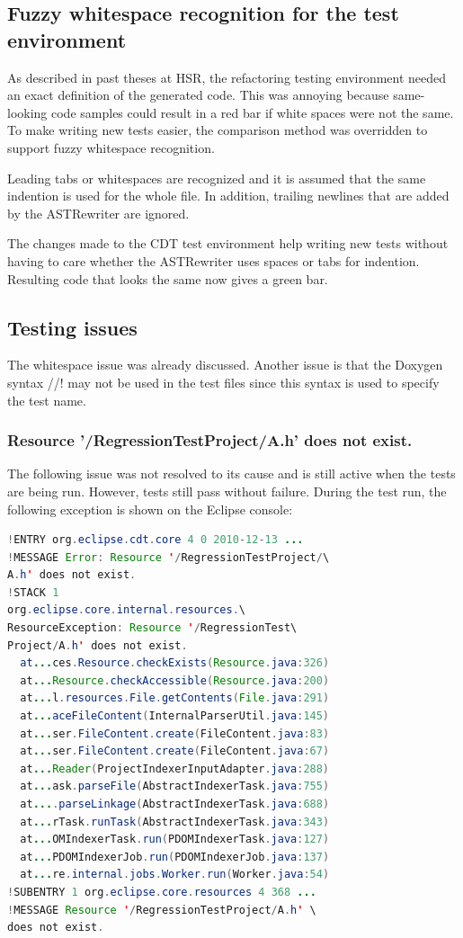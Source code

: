 \subsection[Fuzzy whitespace recognition for the tests]{Fuzzy whitespace 
recognition for the test environment}

As described in past theses at HSR, the refactoring testing environment
needed an exact definition of the generated code. This was annoying because
same-looking code samples could result in a red bar if white spaces were not the
same. To make writing new tests easier, the comparison method was overridden to
support fuzzy whitespace recognition.

Leading tabs or whitespaces are recognized and it is assumed that the same
indention is used for the whole file. In addition, trailing newlines that are
added by the ASTRewriter are ignored.

The changes made to the CDT test environment help writing new tests without
having to care whether the ASTRewriter uses spaces or tabs for indention.
Resulting code that looks the same now gives a green bar.

\subsection{Testing issues}

The whitespace issue was already discussed. Another issue is that the Doxygen 
syntax //! may not be used in the test files since this syntax is used to 
specify the test name.

\subsubsection{Resource '/RegressionTestProject/A.h' does not exist.}

The following issue was not resolved to its cause and is still active when the 
tests are being run. However, tests still pass without failure. During the test 
run, the following exception is shown on the Eclipse console:

\begin{lstlisting}[caption={Randomly appearing error message},language=java]
!ENTRY org.eclipse.cdt.core 4 0 2010-12-13 ...
!MESSAGE Error: Resource '/RegressionTestProject/\
A.h' does not exist.
!STACK 1
org.eclipse.core.internal.resources.\
ResourceException: Resource '/RegressionTest\
Project/A.h' does not exist.
  at...ces.Resource.checkExists(Resource.java:326)
  at...Resource.checkAccessible(Resource.java:200)
  at...l.resources.File.getContents(File.java:291)
  at...aceFileContent(InternalParserUtil.java:145)
  at...ser.FileContent.create(FileContent.java:83)
  at...ser.FileContent.create(FileContent.java:67)
  at...Reader(ProjectIndexerInputAdapter.java:288)
  at...ask.parseFile(AbstractIndexerTask.java:755)
  at....parseLinkage(AbstractIndexerTask.java:688)
  at...rTask.runTask(AbstractIndexerTask.java:343)
  at...OMIndexerTask.run(PDOMIndexerTask.java:127)
  at...PDOMIndexerJob.run(PDOMIndexerJob.java:137)
  at...re.internal.jobs.Worker.run(Worker.java:54)
!SUBENTRY 1 org.eclipse.core.resources 4 368 ...
!MESSAGE Resource '/RegressionTestProject/A.h' \
does not exist.
\end{lstlisting}

